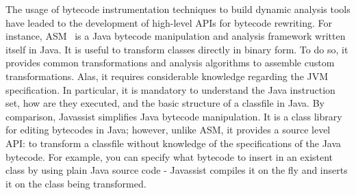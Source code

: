 The usage of bytecode instrumentation techniques to build dynamic analysis tools have leaded to the development of high-level APIs for bytecode rewriting.
For instance, ASM~\cite{Bruneton2002,Kuleshov2007} is a Java bytecode manipulation and analysis framework written itself in Java.
It is useful to transform classes directly in binary form.
To do so, it provides common transformations and analysis algorithms to assemble custom transformations.
Alas, it requires considerable knowledge regarding the JVM specification.
In particular, it is mandatory to understand the Java instruction set, how are they executed, and the basic structure of a classfile in Java.
By comparison, Javassist \cite{Javassist1999} simplifies Java bytecode manipulation.
It is a class library for editing bytecodes in Java; however, unlike ASM, it provides a source level API: to transform a classfile without knowledge of the specifications of the Java bytecode.
For example, you can specify what bytecode to insert in an existent class by using plain Java source code - Javassist compiles it on the fly and inserts it on the class being transformed.

